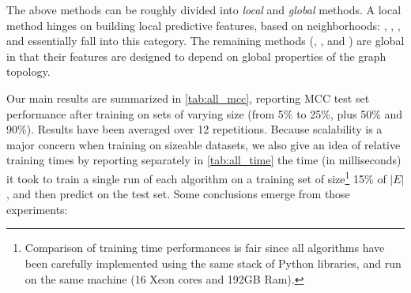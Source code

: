 The above methods can be roughly divided into \emph{local} and \emph{global} methods. A local method
hinges on building local predictive features, based on neighborhoods: \usrule{}, \uslogregp{},
\comptriads{}, and \compbayesian{} essentially fall into this category. The remaining methods
(\uslpropGsec{}, \complowrank{}, \compmaxnorm{} and \compranknodes{}) are global in that their
features are
designed to depend on global properties of the graph topology.

\iffalse
First, with label propagation (referred to as \uslprop{} in the following). We
initialize the labels vector $f_0$ to $|V'|$ random values drawn uniformly in
$[0, 1]$ and set the label of the training edges equal to their observed value.
Let the adjacency matrix of $G'$ be $A$, its diagonal degree matrix
be $D$, its diameter be $\diam{G'}$ and $P$ be the following sparse matrix $P=D^{-1}A$. This allow performing
one round of label propagation as $f_{t+1} = Pf_t$, followed by clamping the
training labels. Each round thus involves $2|E|$ multiplications and we do
$\diam{G'}$ of them\footnote{$\diam{G'}$ is a small constant, ranging from $16$
for \aut{} to $38$ for \epi{}}. With the computed labels, we can associate each
edge $\eij$ with $a_{i,j} = \nicefrac{1}{2}\left(f_{\diam{G'}}(\iout) +
f_{\diam{G'}}(\jin)\right)$.
By sorting the $a$ values of the training edges, we can find the threshold $t$
that minimizes the number of mistakes on the training set while predicting
$\yij = \sgn\left(a_{i,j} - t\right)$ in $O(|\trainset{}|\log |\trainset{}|)$
time.

Then we again associate each edge $\eij$ with $a_{i,j} = \left(1-\htr(i)\right) +
\left(1-\hun(j)\right)$ and find the $\tau$ of \eqref{eq:predictor} that minimizes the empirical
risk.  Another way to exploit those quantities is to train a Logistic Regression model where each
edge is associated with two features: $[1-\htr(i), 1-\hun(j)]$ (we call this method \uslogregp{}).
\fi

\bigskip

Our main results are summarized in \autoref{tab:all_mcc}, reporting MCC test set performance after
training on sets of varying size (from 5\% to 25\%, plus 50\% and 90\%). Results have been averaged
over 12 repetitions.
Because scalability is a major concern when training on sizeable datasets, we also give an idea of
relative training times by reporting separately in \autoref{tab:all_time} the time (in milliseconds) it took to train a single run of
each algorithm on a training set of size\footnote{Comparison of training time performances is fair
since all algorithms have been carefully implemented using the same stack of Python libraries, and
run on the same machine (16 Xeon cores and 192GB Ram).} 15\% of $|E|$, and then predict on the test
set. Some conclusions emerge from those experiments:



